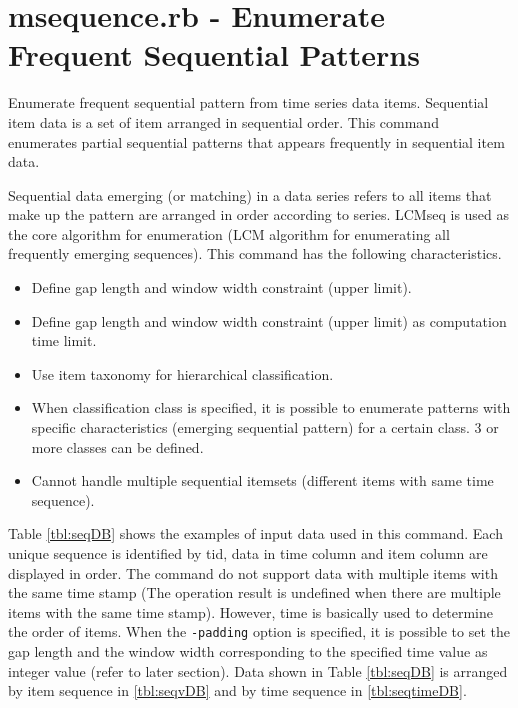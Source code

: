 
\section{msequence.rb - Enumerate Frequent Sequential Patterns\label{sect:msequence}}
Enumerate frequent sequential pattern from time series data items. Sequential item data is a set of item arranged in sequential order. This command enumerates partial sequential patterns that appears frequently in sequential item data. 

Sequential data emerging (or matching) in a data series refers to all items that make up the pattern are arranged in order according to series.  LCMseq is used as the core algorithm for enumeration (LCM algorithm for enumerating all frequently emerging sequences). This command has the following characteristics.

\begin{itemize}
 \item Define gap length and window width constraint (upper limit).
 \item Define gap length and window width constraint (upper limit) as computation time limit. 
 \item Use  item taxonomy for  hierarchical classification.  
 \item When classification class is specified, it is possible to enumerate patterns with specific characteristics  (emerging sequential pattern) for a certain class. 3 or more classes can be defined. 
 \item Cannot handle multiple sequential itemsets (different items with same time sequence).
\end{itemize}

Table \ref{tbl:seqDB} shows the examples of input data used in this command. 
Each unique sequence is identified by tid, data in time column and item column are displayed in order. The command do not support data with multiple items with the same time stamp (The operation result is undefined when there are multiple items with the same time stamp). However, time is basically used to determine the order of items. When the \verb|-padding| option is specified, it is possible to set the  gap length and the window width corresponding to the specified time value as integer value (refer to later section).
Data shown in Table \ref{tbl:seqDB}  is arranged by item sequence in \ref{tbl:seqvDB} and by time sequence in \ref{tbl:seqtimeDB}. 


